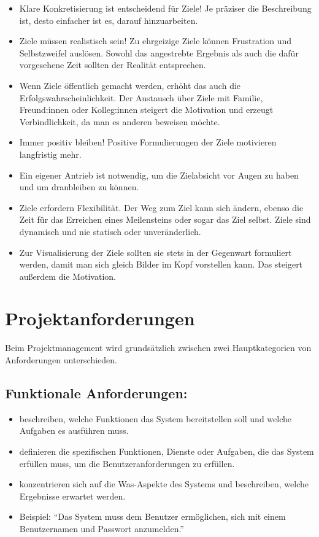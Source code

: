 \begin{itemize}
    \item Klare Konkretisierung ist entscheidend für Ziele! Je präziser die Beschreibung ist, desto einfacher
          ist es, darauf hinzuarbeiten.
    \item Ziele müssen realistisch sein! Zu ehrgeizige Ziele können Frustration und Selbstzweifel
          auslösen. Sowohl das angestrebte Ergebnis als auch die dafür vorgesehene Zeit sollten der Realität
          entsprechen.
    \item Wenn Ziele öffentlich gemacht werden, erhöht das auch die Erfolgswahrscheinlichkeit. Der Austausch
          über Ziele mit Familie, Freund:innen oder Kolleg:innen steigert die Motivation und erzeugt Verbindlichkeit, da
          man es anderen beweisen möchte.
    \item Immer positiv bleiben! Positive Formulierungen der Ziele motivieren langfristig mehr.
    \item Ein eigener Antrieb ist notwendig, um die Zielabsicht vor Augen zu haben und um dranbleiben zu
          können.
    \item Ziele erfordern Flexibilität. Der Weg zum Ziel kann sich ändern, ebenso die Zeit für das Erreichen
          eines Meilensteins oder sogar das Ziel selbst. Ziele sind dynamisch und nie statisch oder unveränderlich.
    \item Zur Visualisierung der Ziele sollten sie stets in der Gegenwart formuliert werden, damit man sich
          gleich Bilder im Kopf vorstellen kann. Das steigert außerdem die Motivation.
\end{itemize}

\section{Projektanforderungen}

Beim Projektmanagement wird grundsätzlich zwischen zwei Hauptkategorien von Anforderungen unterschieden.

\subsection{Funktionale Anforderungen:}
\begin{itemize}
  \item beschreiben, welche Funktionen das System bereitstellen soll und welche Aufgaben es ausführen muss.
  \item definieren die spezifischen Funktionen, Dienste oder Aufgaben, die das System erfüllen muss, um die Benutzeranforderungen zu erfüllen.
  \item konzentrieren sich auf die Was-Aspekte des Systems und beschreiben, welche Ergebnisse erwartet werden.
  \item Beispiel: "`Das System muss dem Benutzer ermöglichen, sich mit einem Benutzernamen und Passwort anzumelden."'
\end{itemize}

